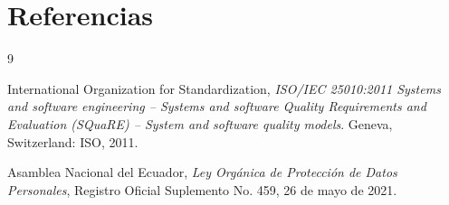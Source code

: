 \documentclass[12pt,a4paper]{article}
\begin{document}
\section{Referencias}

\begin{thebibliography}{9}

International Organization for Standardization,
\textit{ISO/IEC 25010:2011 Systems and software engineering
-- Systems and software Quality Requirements and Evaluation
(SQuaRE) -- System and software quality models}.
Geneva, Switzerland: ISO, 2011.

Asamblea Nacional del Ecuador,
\textit{Ley Orgánica de Protección de Datos Personales},
Registro Oficial Suplemento No. 459, 26 de mayo de 2021.

\end{thebibliography}
\end{document}
